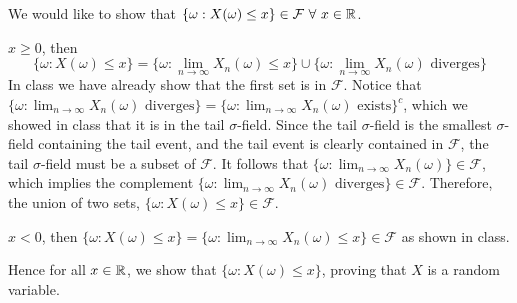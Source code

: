 \documentclass[12pt]{article}
\begin{document}
\begin{problem}[4]
	We would like to show that $ \{\omega: X(\omega) \leq x\} \in \mathcal{F} \ \forall \ x \in \mathbb{R}$.
\begin{case}[]
$ x\geq 0$, then
 \begin{equation*}
	 \{\omega: X(\omega) \leq x\} = \{\omega: \lim_{ n \to \infty} X_n(\omega) \leq x  \} \cup \{\omega: \lim_{ n \to \infty} X_n(\omega) \text{ diverges} \}   
\end{equation*}
In class we have already show that the first set is in $ \mathcal{F}$. Notice that
$ \{\omega: \lim_{ n \to \infty} X_n(\omega) \text{ diverges} \}  = \{\omega: \lim_{ n \to \infty} X_n(\omega) \text{ exists} \}^{c} $, which we showed in class that it is in the tail $\sigma$-field. Since the tail $\sigma$-field is the smallest $\sigma$-field containing the tail event, and the tail event is clearly contained in $ \mathcal{F}$, the tail $\sigma$-field must be a subset of $ \mathcal{F}$. It follows that $ \{\omega: \lim_{ n \to \infty} X_n(\omega)\} \in \mathcal{F}$, which implies the complement $ \{\omega: \lim_{ n \to \infty} X_n(\omega) \text{ diverges} \} \in \mathcal{F}$. Therefore, the union of two sets, $ \{\omega:X(\omega) \leq x\} \in \mathcal{F} $.
\end{case}
\begin{case}[]
	$ x<0$, then  $ \{\omega:X(\omega)\leq x\} = \{\omega: \lim_{ n \to \infty} X_n(\omega) \leq x\} \in \mathcal{F} $ as shown in class.
\end{case}
Hence for all $ x \in \mathbb{R}$, we show that $ \{\omega:X(\omega) \leq x\} $, proving that $ X$ is a random variable.
\end{problem}
\end{document}
